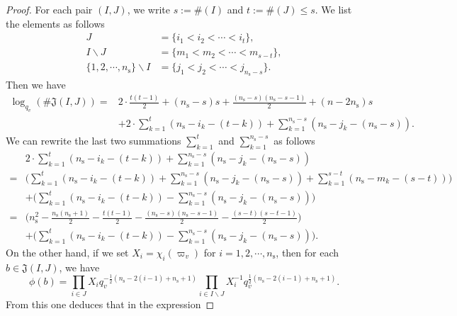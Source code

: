 \documentclass[12pt,oneside,reqno]{amsart}
\theoremstyle{plain}
\begin{document}
\begin{proof}
		For each pair
		$(I,J)$,
		we write
		$s:=\# (I)$
		and
		$t:=
		\# (J)\leq s$.
		We list the elements
		as follows
		\begin{align*}
			J
			&
			=\{i_1<i_2<\cdots<i_t\},
			\\
			I\backslash J
			&
			=
			\{
			m_1<m_2<\cdots<m_{s-t}
			\},
			\\
			\{1,2,\cdots,n_\mathrm{s}\}\backslash I
			&
			=
			\{
			j_1<j_2<\cdots<j_{n_\mathrm{s}-s}
			\}.
		\end{align*}
		Then we have
		\begin{align*}
			\log_{q_v}(\# \mathfrak{J}(I,J))
			=
			&
			2\cdot\frac{t(t-1)}{2}
			+
			(n_\mathrm{s}-s)s
			+
			\frac{(n_\mathrm{s}-s)(n_\mathrm{s}-s-1)}{2}
			+
			(n-2n_\mathrm{s})s
			\\
			&
			+
			2\cdot
			\sum_{k=1}^t
			(n_\mathrm{s}-i_k-(t-k))
			+
			\sum_{k=1}^{n_\mathrm{s}-s}
			(n_\mathrm{s}-j_k-(n_\mathrm{s}-s)).
		\end{align*}
		We can rewrite the last two summations
		$\sum_{k=1}^t$ and $\sum_{k=1}^{n_\mathrm{s}-s}$  
		as follows
		\begin{align*}
			&
			2\cdot
			\sum_{k=1}^t
			(n_\mathrm{s}-i_k-(t-k))
			+
			\sum_{k=1}^{n_\mathrm{s}-s}
			(n_\mathrm{s}-j_k-(n_\mathrm{s}-s))
			\\
			=
			&
			\bigg(  
			\sum_{k=1}^t
			(n_\mathrm{s}-i_k-(t-k))
			+
			\sum_{k=1}^{n_\mathrm{s}-s}
			(n_\mathrm{s}-j_k-(n_\mathrm{s}-s))
			+
			\sum_{k=1}^{s-t}
			(n_\mathrm{s}-m_k-(s-t))
			\bigg)
			\\
			&
			+
			\bigg(   
			\sum_{k=1}^t
			(n_\mathrm{s}-i_k-(t-k))
			-
			\sum_{k=1}^{n_\mathrm{s}-s}
			(n_\mathrm{s}-j_k-(n_\mathrm{s}-s))
			\bigg)
			\\
			=
			&
			\bigg(
			n_\mathrm{s}^2
			-\frac{n_\mathrm{s}(n_\mathrm{s}+1)}{2}
			-\frac{t(t-1)}{2}
			-\frac{(n_\mathrm{s}-s)(n_\mathrm{s}-s-1)}{2}
			-\frac{(s-t)(s-t-1)}{2}
			\bigg)
			\\
			&
			+
			\bigg(
			\sum_{k=1}^t
			(n_\mathrm{s}-i_k-(t-k))
			-
			\sum_{k=1}^{n_\mathrm{s}-s}
			(n_\mathrm{s}-j_k-(n_\mathrm{s}-s))
			\bigg).
		\end{align*}
		On the other hand,
		if we set
		$X_i=\chi_i(\varpi_v)$
		for
		$i=1,2,\cdots,n_\mathrm{s}$,
		then for each
		$b\in\mathfrak{J}(I,J)$,
		we have
		\[
		\phi(b)
		=
		\prod_{i\in J}X_iq_v^{-\frac{1}{2}(n_\mathrm{s}-2(i-1)+n_\mathrm{s}+1)}
		\prod_{i\in I\backslash J}
		X_i^{-1}
		q_v^{\frac{1}{2}(n_\mathrm{s}-2(i-1)+n_\mathrm{s}+1)}.
		\]
		From this one deduces that in the expression

\end{proof}
\end{document}
